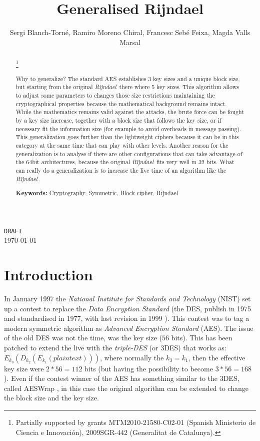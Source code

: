 \documentclass[10pt,a4paper,twoside]{llncs}
\title{Generalised Rijndael}
\author{Sergi Blanch-Torn\'e\inst{1}, Ramiro Moreno Chiral\inst{2}, Francesc Seb\'e Feixa\inst{2}, Magda Valls Marsal\inst{2}}
\institute{
 Escola Polit\`ecnica Superior, Universitat de Lleida. Spain.\\
 \email{\tt sblanch@alumnes.udl.es}
 \and 
 Departament de Matem\`atica. Universitat de Lleida. Spain.\\
 \email{\tt \{ramiro,fsebe,magda\}@matematica.udl.es}
 }
\newcommand{\rijndael}{\emph{Rijndael}}
\begin{document}
\maketitle
\begin{center}
 {\tt DRAFT}\\
 \today\\
\end{center}

\begin{abstract}\footnote{Partially supported by grants MTM2010-21580-C02-01 (Spanish Ministerio de Ciencia e Innovaci\'on), 2009SGR-442 (Generalitat de Catalunya).}

Why to generalize? The standard AES establishes 3 key sizes and a unique block size, but starting from the original \rijndael\, there where 5 key sizes. This algorithm allows to adjust some parameters to changes those size restrictions maintaining the cryptographical properties because the mathematical background remains intact. While the mathematics remains valid against the attacks, the brute force can be fought by a key size increase, together with a block size that follows the key size, or if necessary fit the information size (for example to avoid overheads in message passing). This generalization goes further than the lightweight ciphers because it can be in this category at the same time that can play with other levels.
Another reason for the generalization is to analyse if there are other configurations that can take advantage of the $64$bit architectures, because the original \rijndael\, fits very well in $32$ bits.
What can really do a generalization is to increase the live time of an algorithm like the \rijndael\,.

{\bf Keywords:} Cryptography, Symmetric, Block cipher, Rijndael
\end{abstract}

\section{Introduction}\label{sec:intro}

In January 1997 the \emph{National Institute for Standards and Technology} (NIST) set up a contest to replace the \emph{Data Encryption Standard} (the DES, publish in 1975 and standardised in 1977, with last revision in 1999 \cite{FIPS_46-3}). This contest was to tag a modern symmetric algorithm as \emph{Advanced Encryption Standard} (AES). The issue of the old DES was not the time, was the key size ($56$ bits). This has been patched to extend the live with the \emph{triple-DES} (or 3DES) that works as: $ E_{k_3}(D_{k_2}(E_{k_1}(plaintext)))$, where normally the $k_3=k_1$, then the effective key size were $2*56=112$ bits (but having the possibility to become $3*56=168$). Even if the contest winner of the AES has something similar to the 3DES, called AESWrap \cite{rfc3394}, in this case the original algorithm can be extended to change the block size and the key size.
\end{document}
